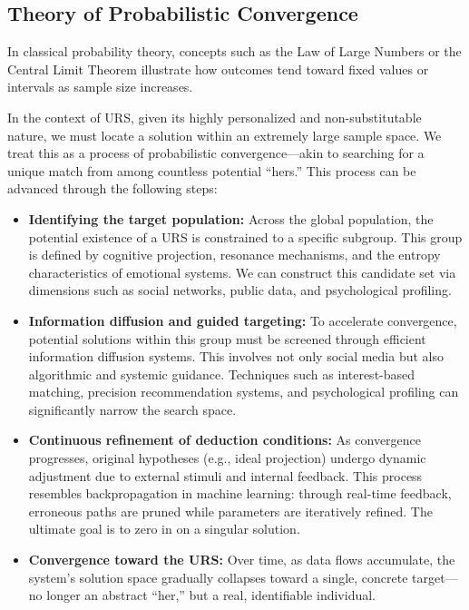 \documentclass[12pt]{article}
\begin{document}
\subsection{Theory of Probabilistic Convergence}

In classical probability theory, concepts such as the Law of Large Numbers or the Central Limit Theorem illustrate how outcomes tend toward fixed values or intervals as sample size increases.

In the context of URS, given its highly personalized and non-substitutable nature, we must locate a solution within an extremely large sample space. We treat this as a process of probabilistic convergence—akin to searching for a unique match from among countless potential ``hers.'' This process can be advanced through the following steps:

\begin{itemize}
  \item \textbf{Identifying the target population:} Across the global population, the potential existence of a URS is constrained to a specific subgroup. This group is defined by cognitive projection, resonance mechanisms, and the entropy characteristics of emotional systems. We can construct this candidate set via dimensions such as social networks, public data, and psychological profiling.
\end{itemize}
\begin{itemize}
  \item \textbf{Information diffusion and guided targeting:} To accelerate convergence, potential solutions within this group must be screened through efficient information diffusion systems. This involves not only social media but also algorithmic and systemic guidance. Techniques such as interest-based matching, precision recommendation systems, and psychological profiling can significantly narrow the search space.
  
  \item \textbf{Continuous refinement of deduction conditions:} As convergence progresses, original hypotheses (e.g., ideal projection) undergo dynamic adjustment due to external stimuli and internal feedback. This process resembles backpropagation in machine learning: through real-time feedback, erroneous paths are pruned while parameters are iteratively refined. The ultimate goal is to zero in on a singular solution.

  \item \textbf{Convergence toward the URS:} Over time, as data flows accumulate, the system’s solution space gradually collapses toward a single, concrete target—no longer an abstract ``her,'' but a real, identifiable individual.
\end{itemize}
\end{document}
